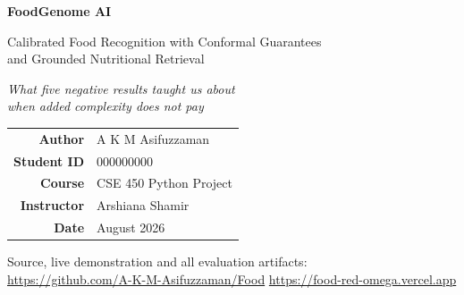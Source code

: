 \documentclass[11pt,a4paper,twoside]{article}
\newcommand{\StudentName}{A K M Asifuzzaman}
\newcommand{\StudentID}{000000000}          %
\newcommand{\CourseCode}{CSE 450 Python Project}
\newcommand{\Instructor}{Arshiana Shamir}
\newcommand{\SubmissionDate}{August 2026}
\begin{document}
\begin{titlepage}
\centering
\vspace*{1.2cm}
{\Large\bfseries\color{edumaroon} FoodGenome AI\par}
\vspace{0.4cm}
{\large Calibrated Food Recognition with Conformal Guarantees\\and Grounded Nutritional Retrieval\par}
\vspace{1.4cm}
{\normalsize\itshape What five negative results taught us about\\when added complexity does not pay\par}
\vspace{2.2cm}
\begin{tabular}{rl}
\textbf{Author}      & \StudentName \\
\textbf{Student ID}  & \StudentID \\
\textbf{Course}      & \CourseCode \\
\textbf{Instructor}  & \Instructor \\
\textbf{Date}        & \SubmissionDate \\
\end{tabular}
\vfill
{\small Source, live demonstration and all evaluation artifacts:\\
\url{https://github.com/A-K-M-Asifuzzaman/Food} \quad\textbullet\quad
\url{https://food-red-omega.vercel.app}\par}
\vspace{0.8cm}
\end{titlepage}
\end{document}

